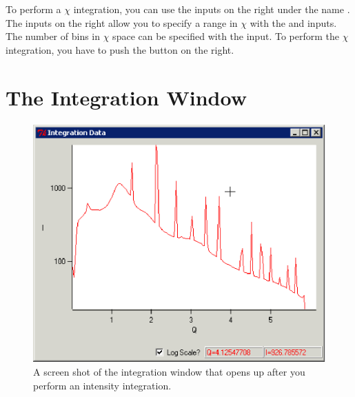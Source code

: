 To perform a $\chi$ integration, you can use the inputs
on the right under the name .
The inputs on the right allow you to specify
a range in $\chi$ with the  and
 inputs. The number of bins in
$\chi$ space can be specified with the
 input. To perform the
$\chi$ integration, you have to push the
 button on the right.

\section{The Integration Window}

\begin{figure}
    \centering
    \includegraphics[scale=.75]{figures/integration_window_q.eps}
    \caption{A screen shot of the integration window that
    opens up after you perform an intensity integration.} 
    \label{integration_window_q}
\end{figure}

